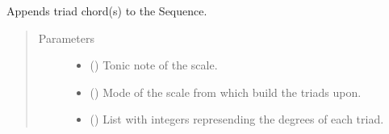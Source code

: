 \documentclass[letterpaper,10pt,english]{sphinxmanual}
\begin{document}
\begin{fulllineitems}
\begin{fulllineitems}
\label{\detokenize{birdears:birdears.sequence.Sequence.make_chord_progression}}
\sphinxAtStartPar
Appends triad chord(s) to the Sequence.
\begin{quote}\begin{description}
\item[{Parameters}] \leavevmode\begin{itemize}
\item {} 
\sphinxAtStartPar
{} () \textendash{} Tonic note of the scale.

\item {} 
\sphinxAtStartPar
{} () \textendash{} Mode of the scale from which build the triads upon.

\item {} 
\sphinxAtStartPar
{} () \textendash{} List with integers represending the degrees
of each triad.

\end{itemize}

\end{description}\end{quote}

\end{fulllineitems}


\begin{fulllineitems}
\label{\detokenize{birdears:birdears.sequence.Sequence.play}}
\end{fulllineitems}


\end{fulllineitems}
\end{document}
